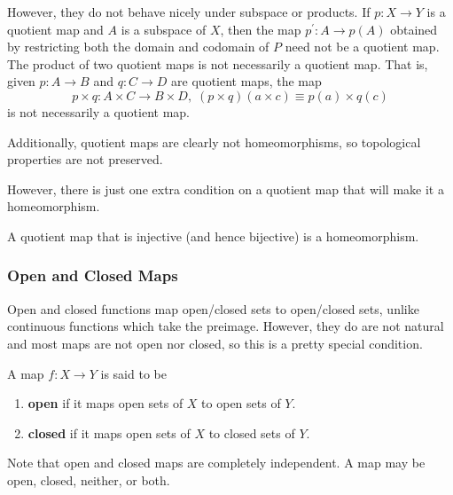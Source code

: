     However, they do not behave nicely under subspace or products. If $p: X \rightarrow Y$ is a quotient map and $A$ is a subspace of $X$, then the map $p^\prime: A \rightarrow p(A)$ obtained by restricting both the domain and codomain of $P$ need not be a quotient map. The product of two quotient maps is not necessarily a quotient map. That is, given $p: A \rightarrow B$ and $q: C \rightarrow D$ are quotient maps, the map 
    \begin{equation}
      p \times q: A \times C \rightarrow B \times D, \; (p \times q) (a \times c) \equiv p(a) \times q(c)
    \end{equation}
    is not necessarily a quotient map. 

    \begin{example}
      
    \end{example}

    \begin{example}
      
    \end{example}

    Additionally, quotient maps are clearly not homeomorphisms, so topological properties are not preserved. 

    \begin{example}[]
      
    \end{example}

    However, there is just one extra condition on a quotient map that will make it a homeomorphism.  

    \begin{lemma}
      A quotient map that is injective (and hence bijective) is a homeomorphism. 
    \end{lemma} 

  \subsubsection{Open and Closed Maps}

    Open and closed functions map open/closed sets to open/closed sets, unlike continuous functions which take the preimage. However, they do are not natural and most maps are not open nor closed, so this is a pretty special condition. 

    \begin{definition}
      A map $f: X \rightarrow Y$ is said to be 
      \begin{enumerate}
        \item \textbf{open} if it maps open sets of $X$ to open sets of $Y$. 
        \item \textbf{closed} if it maps open sets of $X$ to closed sets of $Y$. 
      \end{enumerate}
      Note that open and closed maps are completely independent. A map may be open, closed, neither, or both. 
    \end{definition}

